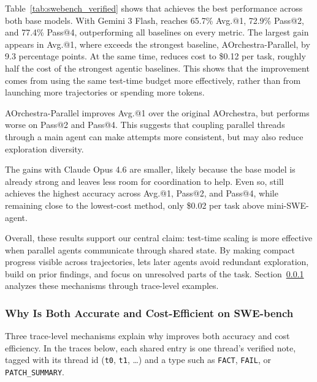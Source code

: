 Table~\ref{tab:swebench_verified} shows that \toolName{} achieves the best performance across both base models. With Gemini 3 Flash, \toolName{} reaches 65.7\% Avg.@1, 72.9\% Pass@2, and 77.4\% Pass@4, outperforming all baselines on every metric. The largest gain appears in Avg.@1, where \toolName{} exceeds the strongest baseline, AOrchestra-Parallel, by 9.3 percentage points. At the same time, \toolName{} reduces cost to \$0.12 per task, roughly half the cost of the strongest agentic baselines. This shows that the improvement comes from using the same test-time budget more effectively, rather than from launching more trajectories or spending more tokens.

AOrchestra-Parallel improves Avg.@1 over the original AOrchestra, but performs worse on Pass@2 and Pass@4. This suggests that coupling parallel threads through a main agent can make attempts more consistent, but may also reduce exploration diversity.

The gains with Claude Opus 4.6 are smaller, likely because the base model is already strong and leaves less room for coordination to help. Even so, \toolName{} still achieves the highest accuracy across Avg.@1, Pass@2, and Pass@4, while remaining close to the lowest-cost method, only \$0.02 per task above mini-SWE-agent.

Overall, these results support our central claim: test-time scaling is more effective when parallel agents communicate through shared state. By making compact progress visible across trajectories, \toolName{} lets later agents avoid redundant exploration, build on prior findings, and focus on unresolved parts of the task. Section~\ref{sec:swe_analyze} analyzes these mechanisms through trace-level examples.
\vspace{-7mm}
\subsubsection{Why \toolName{} Is Both Accurate and Cost-Efficient on SWE-bench}
\label{sec:swe_analyze}
\vspace{-2mm}

Three trace-level mechanisms explain why \toolName{} improves both accuracy and cost efficiency. In the \toolName{} traces below, each shared entry is one thread's verified note, tagged with its thread id (\texttt{t0}, \texttt{t1}, \dots) and a type such as \texttt{FACT}, \texttt{FAIL}, or \texttt{PATCH\_SUMMARY}.

